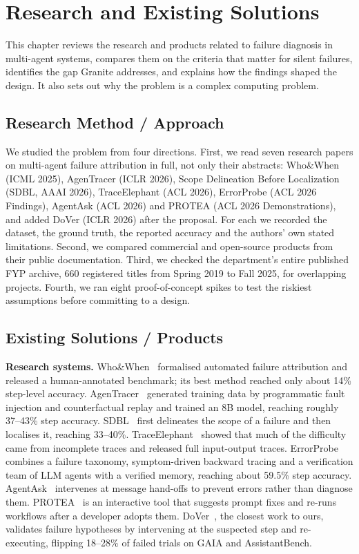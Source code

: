 \chapter{Research and Existing Solutions}

This chapter reviews the research and products related to failure diagnosis in multi-agent systems, compares them on the criteria that matter for silent failures, identifies the gap Granite addresses, and explains how the findings shaped the design. It also sets out why the problem is a complex computing problem.

\section{Research Method / Approach}

We studied the problem from four directions. First, we read seven research papers on multi-agent failure attribution in full, not only their abstracts: Who\&When (ICML 2025), AgenTracer (ICLR 2026), Scope Delineation Before Localization (SDBL, AAAI 2026), TraceElephant (ACL 2026), ErrorProbe (ACL 2026 Findings), AgentAsk (ACL 2026) and PROTEA (ACL 2026 Demonstrations), and added DoVer (ICLR 2026) after the proposal. For each we recorded the dataset, the ground truth, the reported accuracy and the authors' own stated limitations. Second, we compared commercial and open-source products from their public documentation. Third, we checked the department's entire published FYP archive, 660 registered titles from Spring 2019 to Fall 2025, for overlapping projects. Fourth, we ran eight proof-of-concept spikes to test the riskiest assumptions before committing to a design.

\section{Existing Solutions / Products}

\textbf{Research systems.} Who\&When~\cite{whowhen} formalised automated failure attribution and released a human-annotated benchmark; its best method reached only about 14\% step-level accuracy. AgenTracer~\cite{agentracer} generated training data by programmatic fault injection and counterfactual replay and trained an 8B model, reaching roughly 37--43\% step accuracy. SDBL~\cite{sdbl} first delineates the scope of a failure and then localises it, reaching 33--40\%. TraceElephant~\cite{traceelephant} showed that much of the difficulty came from incomplete traces and released full input-output traces. ErrorProbe~\cite{errorprobe} combines a failure taxonomy, symptom-driven backward tracing and a verification team of LLM agents with a verified memory, reaching about 59.5\% step accuracy. AgentAsk~\cite{agentask} intervenes at message hand-offs to prevent errors rather than diagnose them. PROTEA~\cite{protea} is an interactive tool that suggests prompt fixes and re-runs workflows after a developer adopts them. DoVer~\cite{dover}, the closest work to ours, validates failure hypotheses by intervening at the suspected step and re-executing, flipping 18--28\% of failed trials on GAIA and AssistantBench.

